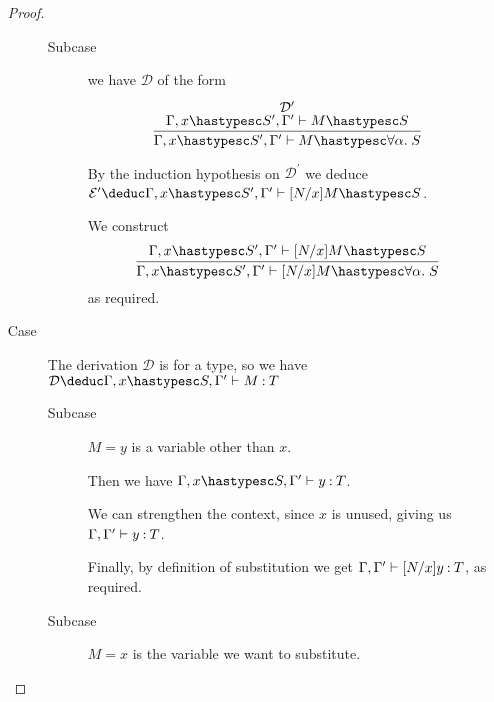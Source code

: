 \documentclass[11pt]{article}
\begin{document}
\begin{enumerate}
\begin{proof}
\begin{description}
\begin{description}
            \item[Subcase]
              we have $\mathcal{D}$ of the form
              \begin{equation*}
                \infer{
                  \Gamma, x \hastypesc S^\prime, \Gamma^\prime \proves M \hastypesc \forall \alpha.\; S
                }{
                  \deduce[\mathcal{D}^\prime]{
                    \Gamma, x \hastypesc S^\prime, \Gamma^\prime \proves M \hastypesc S
                  }{}
                }
              \end{equation*}

              By the induction hypothesis on $\mathcal{D}^\prime$ we deduce
              $\mathcal{E}^\prime \deduc \Gamma, x \hastypesc S^\prime, \Gamma^\prime \proves [N/x]M \hastypesc S$.

              We construct
              \begin{equation*}
                \infer{
                  \Gamma, x \hastypesc S^\prime, \Gamma^\prime \proves [N/x]M \hastypesc \forall \alpha.\; S
                }{
                  \Gamma, x \hastypesc S^\prime, \Gamma^\prime \proves [N/x]M \hastypesc S
                }
              \end{equation*}
              as required.
          \end{description}

        \item[Case]
          The derivation $\mathcal{D}$ is for a type, so we have
          $
          \mathcal{D} \deduc \Gamma, x \hastypesc S, \Gamma^\prime
          \proves M \hastype T
          $
          \begin{description}
            \item[Subcase]
              $M = y$ is a variable other than $x$.

              Then we have
              $\Gamma, x \hastypesc S, \Gamma^\prime \proves y \hastype T$.

              We can strengthen the context, since $x$ is unused, giving us
              $\Gamma, \Gamma^\prime \vdash y \mathbin{:} T$.

              Finally, by definition of substitution we get
              $\Gamma, \Gamma^\prime \vdash [N/x]y \mathbin{:} T$,
              as required.

            \item[Subcase]
              $M = x$ is the variable we want to substitute.


\end{description}
\end{description}
\end{proof}
\end{enumerate}
\end{document}
